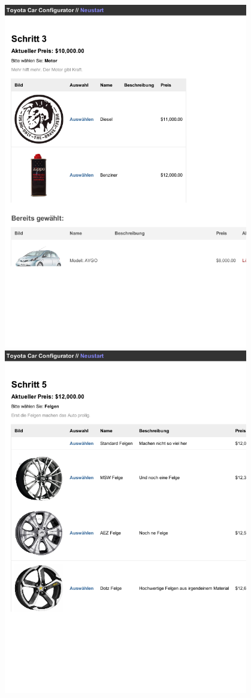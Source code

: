 \documentclass[a4paper,10pt]{article}
\begin{document}
\\
\includegraphics[width=0.8\textwidth]{screenshots/screenshot4.png}
\\
\includegraphics[width=0.8\textwidth]{screenshots/screenshot5.png}
\end{document}
